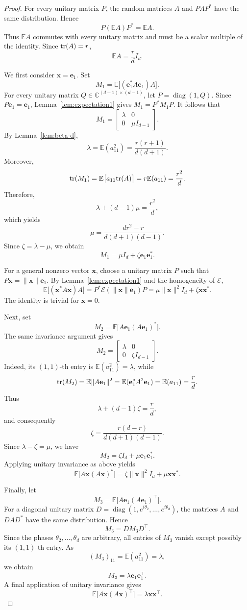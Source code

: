 \documentclass{article}
\newcommand{\C}{{\mathbb C}}
\newcommand{\E}{{\mathbb E}}
\newcommand{\tr}{{\rm tr}}
\newcommand{\vx}{{\mathbf x}}
\newcommand{\ve}{{\mathbf e}}
\newcommand{\0}{{\mathbf 0}}
\numberwithin{equation}{section}
\begin{document}
	\begin{proof}
		For every unitary matrix $P$, the random matrices $A$ and $PAP^*$ have the same distribution. Hence
		\[
		P(\E A)P^*=\E A.
		\]
		Thus $\E A$ commutes with every unitary matrix and must be a scalar multiple of the identity. Since $\tr(A)=r$,
		\[
		\E A=\frac rd I_d.
		\]
		
		We first consider $\vx=\ve_1$. Set
		\[
		M_1=\E\big[(\ve_1^*A\ve_1)A\big].
		\]
		For every unitary matrix $Q\in\C^{(d-1)\times(d-1)}$, let $P=\operatorname{diag}(1,Q)$. Since $P\ve_1=\ve_1$, Lemma~\ref{lem:expectation1} gives $M_1=P^*M_1P$. It follows that
		\[
		M_1=\begin{bmatrix}\lambda&0\\0&\mu I_{d-1}\end{bmatrix}.
		\]
		By Lemma~\ref{lem:beta-d},
		\[
		\lambda=\E(a_{11}^2)=\frac{r(r+1)}{d(d+1)}.
		\]
		Moreover,
		\[
		\tr(M_1)=\E\big[a_{11}\tr(A)\big]=r\E(a_{11})=\frac{r^2}{d}.
		\]
		Therefore,
		\[
		\lambda+(d-1)\mu=\frac{r^2}{d},
		\]
		which yields
		\[
		\mu=\frac{dr^2-r}{d(d+1)(d-1)}.
		\]
		Since $\zeta=\lambda-\mu$, we obtain
		\[
		M_1=\mu I_d+\zeta \ve_1\ve_1^*.
		\]
		
		For a general nonzero vector $\vx$, choose a unitary matrix $P$ such that $P\vx=\|\vx\|\ve_1$. By Lemma~\ref{lem:expectation1} and the homogeneity of $\mathcal E$,
		\[
		\E\big[(\vx^*A\vx)A\big]=P^*\mathcal E(\|\vx\|\ve_1)P
		=\mu\|\vx\|^2I_d+\zeta\vx\vx^*.
		\]
		The identity is trivial for $\vx=0$.
		
		Next, set
		\[
		M_2=\E\big[A\ve_1(A\ve_1)^*\big].
		\]
		The same invariance argument gives
		\[
		M_2=\begin{bmatrix}\lambda&0\\0&\zeta I_{d-1}\end{bmatrix}.
		\]
		Indeed, its $(1,1)$-th entry is $\E(a_{11}^2)=\lambda$, while
		\[
		\tr(M_2)=\E\|A\ve_1\|^2=\E(\ve_1^*A^2\ve_1)=\E(a_{11})=\frac rd.
		\]
		Thus
		\[
		\lambda+(d-1)\zeta=\frac rd,
		\]
		and consequently
		\[
		\zeta=\frac{r(d-r)}{d(d+1)(d-1)}.
		\]
		Since $\lambda-\zeta=\mu$, we have
		\[
		M_2=\zeta I_d+\mu \ve_1\ve_1^*.
		\]
		Applying unitary invariance as above yields
		\[
		\E\big[A\vx(A\vx)^*\big]=\zeta\|\vx\|^2I_d+\mu\vx\vx^*.
		\]
		
		Finally, let
		\[
		M_3=\E\big[A\ve_1(A\ve_1)^\top\big].
		\]
		For a diagonal unitary matrix $D=\operatorname{diag}(1,e^{i\theta_2},\ldots,e^{i\theta_d})$, the matrices $A$ and $DAD^*$ have the same distribution. Hence
		\[
		M_3=DM_3D^\top.
		\]
		Since the phases $\theta_2,\ldots,\theta_d$ are arbitrary, all entries of $M_3$ vanish except possibly its $(1,1)$-th entry. As
		\[
		(M_3)_{11}=\E(a_{11}^2)=\lambda,
		\]
		we obtain
		\[
		M_3=\lambda \ve_1\ve_1^\top.
		\]
		A final application of unitary invariance gives
		\[
		\E\big[A\vx(A\vx)^\top\big]=\lambda\vx\vx^\top.
		\]
	\end{proof}
	
\end{document}
